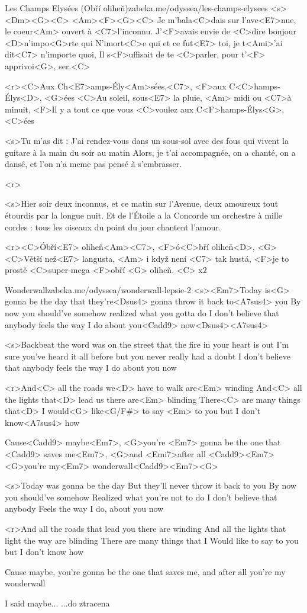 \begin{song}{23}{Les Champs Elysées (Obří oliheň)}{zabeka.me/odyssea/les-champs-elysees}
<s><Dm><G><C> <Am><F><G><C>
Je m'bala<C>dais sur l'ave<E7>nue, le coeur<Am> ouvert à <C7>l'inconnu. 
J'<F>avais envie de <C>dire bonjour <D>n'impo<G>rte qui 
N'imort<C>e qui et ce fut<E7> toi, je t<Ami>'ai dit<C7> n'importe quoi, 
Il s<F>uffisait de te <C>parler, pour t'<F> apprivoi<G>, ser.<C> 

<r><C>Aux Ch<E7>amps-Ély<Am>sées,<C7>, <F>aux C<C>hamps-Élys<D>, <G>ées 
<C>Au soleil, sous<E7> la pluie, <Am> midi ou <C7>à minuit, 
<F>Il y a tout ce que vous <C>voulez aux C<F>hamps-Élys<G>, <C>ées 

<s>Tu m'as dit : J'ai rendez-vous
dans un sous-sol avec des fous
qui vivent la guitare à la main
du soir au matin
Alors, je t'ai accompagnée, 
on a chanté, on a dansé,
et l'on n'a meme pas pensé
à s'embrasser.

<r>

<s>Hier soir deux inconnus,
et ce matin sur l'Avenue,
deux amoureux tout étourdis
par la longue nuit.
Et de l'Étoile a la Concorde
un orchestre à mille cordes :
tous les oiseaux du point du jour
chantent l'amour.

<r><C>Óbří<E7> oliheň<Am><C7>, <F>ó<C>bří oliheň<D>, <G>
<C>Větší než<E7> langusta, <Am> i když není <C7> tak hustá, 
<F>je to prostě <C>super-mega <F>obří <G> oliheň. <C> x2
\end{song}
\begin{song}[Oasis]{24}{Wonderwall}{zabeka.me/odyssea/wonderwall-lepsie-2}
<s><Em7>Today is<G> gonna be the day
that they're<Dsus4> gonna throw it back to<A7sus4> you 
By now you should've somehow
realized what you gotta do
I don't believe that anybody 
feels the way I do about you<Cadd9> now<Dsus4><A7sus4>

<s>Backbeat the word was on the street
that the fire in your heart is out
I'm sure you've heard it all before
but you never really had a doubt
I don't believe that anybody 
feels the way I do about you now

<r>And<C> all the roads we<D> have to walk are<Em> winding
And<C> all the lights that<D> lead us there are<Em> blinding
There<C> are many things that<D> I would<G> like<G/F#> to say <Em> to you
but I don't know<A7sus4> how

Cause<Cadd9> maybe<Em7>, <G>you're <Em7> gonna be the one that
<Cadd9> saves me<Em7>, <G>and <Emi7>after all
<Cadd9><Em7><G>you're my<Em7> wonderwall<Cadd9><Em7><G>

<s>Today was gonna be the day
But they'll never throw it back to you
By now you should've somehow
Realized what you're not to do
I don't believe that anybody
Feels the way I do, about you now

<r>And all the roads that lead you there are winding
And all the lights that light the way are blinding
There are many things that I
Would like to say to you but I don't know how

Cause maybe, you're gonna be the one that
saves me, and after all
you're my wonderwall

I said maybe... ...do ztracena
\end{song}
